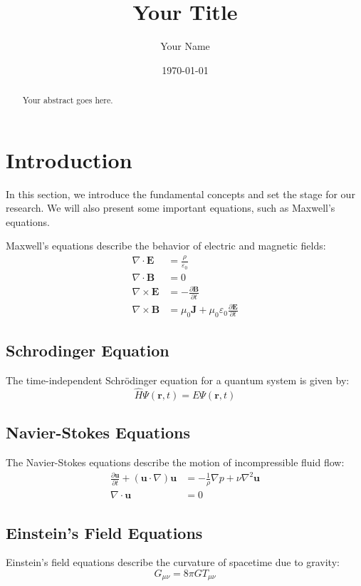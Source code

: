 \documentclass{article}
\title{Your Title}
\author{Your Name}
\date{\today}
\begin{document}
\maketitle

\begin{abstract}
Your abstract goes here.
\end{abstract}

\section{Introduction}
In this section, we introduce the fundamental concepts and set the stage for our research. We will also present some important equations, such as Maxwell's equations.

Maxwell's equations describe the behavior of electric and magnetic fields:
\begin{align}
    \nabla \cdot \mathbf{E} &= \frac{\rho}{\varepsilon_0} \\
    \nabla \cdot \mathbf{B} &= 0 \\
    \nabla \times \mathbf{E} &= -\frac{\partial \mathbf{B}}{\partial t} \\
    \nabla \times \mathbf{B} &= \mu_0\mathbf{J} + \mu_0\varepsilon_0\frac{\partial \mathbf{E}}{\partial t}
\end{align}

\subsection{Schrodinger Equation}
The time-independent Schrödinger equation for a quantum system is given by:
\begin{equation}
    \hat{H}\Psi(\mathbf{r}, t) = E\Psi(\mathbf{r}, t)
\end{equation}
\subsection{Navier-Stokes Equations}
The Navier-Stokes equations describe the motion of incompressible fluid flow:
\begin{align}
    \frac{\partial \mathbf{u}}{\partial t} + (\mathbf{u} \cdot \nabla)\mathbf{u} &= -\frac{1}{\rho}\nabla p + \nu\nabla^2\mathbf{u} \\
    \nabla \cdot \mathbf{u} &= 0
\end{align}

\subsection{Einstein's Field Equations}
Einstein's field equations describe the curvature of spacetime due to gravity:
\begin{equation}
    G_{\mu\nu} = 8\pi GT_{\mu\nu}
\end{equation}
\end{document}
